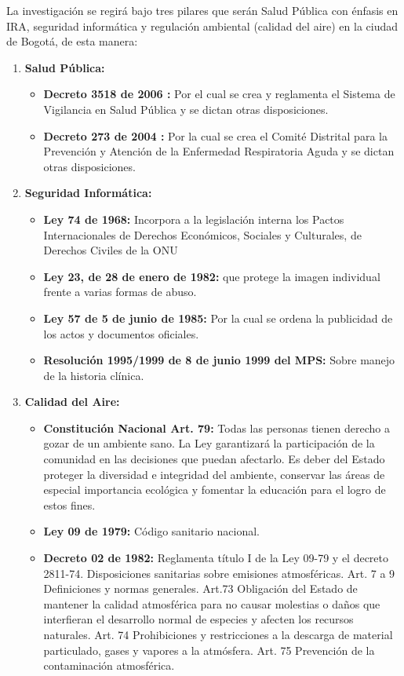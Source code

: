 \documentclass[a4paper, 11pt, oneside]{article}
\theoremstyle{definition}
\theoremstyle{remark}
\begin{document}
La investigación se regirá bajo tres pilares que serán Salud Pública con énfasis en IRA, seguridad informática y regulación ambiental (calidad del aire) en la ciudad de Bogotá, de esta manera:
\begin{enumerate}[I]%
\item\textbf{Salud Pública:}
	\begin{itemize}
    \item\textbf{Decreto 3518 de 2006 :} Por el cual se crea y reglamenta el 		Sistema de Vigilancia en Salud Pública y se dictan otras disposiciones.
	\item\textbf{Decreto 273 de 2004 :} Por la cual se crea el Comité Distrital 	para la Prevención y Atención de la Enfermedad Respiratoria Aguda y se dictan 	  otras disposiciones.
	\end{itemize}
\item\textbf{Seguridad Informática:}
	\begin{itemize}
    \item\textbf{Ley 74 de 1968: }  Incorpora a la legislación interna los Pactos 	  Internacionales de Derechos Económicos, Sociales y Culturales, de Derechos 	 Civiles de la ONU  
	\item\textbf{Ley 23, de 28 de enero de 1982: }que protege la imagen 		     individual frente a varias formas de abuso.
    \item\textbf{Ley 57 de 5 de junio de 1985: } Por la cual se ordena la 			publicidad de los actos y documentos oficiales.
    \item\textbf{Resolución 1995/1999 de 8 de junio 1999 del MPS: } Sobre manejo 	 de la historia clínica.
	\end{itemize}
\item\textbf{Calidad del Aire:}
	\begin{itemize}
    \item\textbf{Constitución Nacional Art. 79: }  Todas las personas tienen 		derecho a gozar de un ambiente sano. La Ley garantizará la participación de 	la comunidad en las decisiones que puedan afectarlo. Es deber del Estado 		proteger la diversidad e integridad del ambiente, conservar las áreas de 		especial importancia ecológica y fomentar la educación para el logro de estos 	  fines.
	\item\textbf{Ley 09 de 1979: }Código sanitario nacional.
    \item\textbf{Decreto 02 de 1982: } Reglamenta título I de la Ley 09-79 y el        decreto 2811-74. Disposiciones sanitarias sobre emisiones atmosféricas. Art. 	7 a 9 Definiciones y normas generales. Art.73 Obligación del Estado de 			mantener la calidad atmosférica para no causar molestias o daños que 			interfieran el desarrollo normal de especies y afecten los recursos 			naturales. Art. 74 Prohibiciones y restricciones a la descarga de material 		particulado, gases y vapores a la atmósfera. Art. 75 Prevención de la 			contaminación atmosférica.

\end{itemize}
\end{enumerate}
\end{document}
